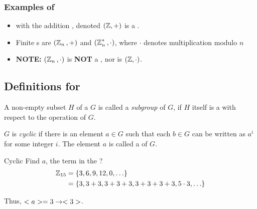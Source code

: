 \subsubsection{Examples of }\label{subsubsec:Examples_of_Groups}
\begin{itemize}[noitemsep]
\item \TextAllIntegers{} with the addition , denoted $(\operatorname{\mathbb{Z}}, +)$ is a .
\item Finite s are $(\operatorname{\mathbb{Z}}_{n}{}, +)$ and $(\operatorname{\mathbb{Z}}_{n}^{*}{}, \cdot)$, where $\cdot$ denotes multiplication modulo $n$
\item \textbf{NOTE:} $(\operatorname{\mathbb{Z}}_{n}{}, \cdot)$ is \textbf{NOT} a , nor is $(\operatorname{\mathbb{Z}}, \cdot)$.
\end{itemize}

\subsection{Definitions for }\label{subsec:Definitions_for_Groups}
\begin{definition}[Subgroup]\label{def:Subgroup}
  A non-empty subset $H$ of a  $G$ is called a \emph{subgroup} of $G$, if $H$ itself is a  with respect to the operation of $G$.
\end{definition}

\begin{definition}[Cyclic]\label{def:Cyclic}
  $G$ is \emph{cyclic} if there is an element $a \in G$ such that each $b \in G$ can be written as $a^{i}$ for some integer $i$.
  The element $a$ is called a \emph{} of $G$.
\end{definition}

\begin{example}[]{Cyclic}
  Find $a$, the  term in the  ?
  \tcblower{}
  \begin{equation*}
    \begin{aligned}
      \operatorname{\mathbb{Z}}_{15} &= \lbrace 3, 6, 9, 12, 0, \ldots \rbrace \\
      &= \lbrace 3, 3+3, 3+3+3, 3+3+3+3, 5 \cdot 3, \ldots \rbrace \\
    \end{aligned}
  \end{equation*}

  Thus, $<a> = 3 \rightarrow <3>$.
\end{example}


